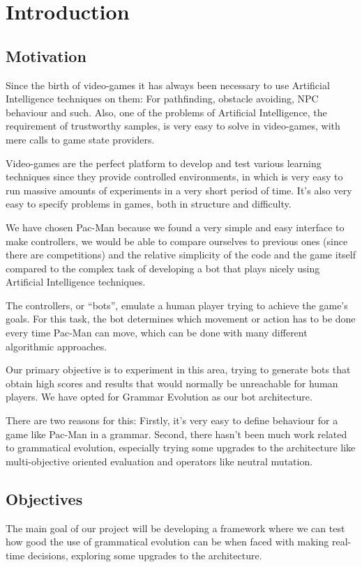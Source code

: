 \chapter{Introduction} \label{cap:introduction}

\section{Motivation}
Since the birth of video-games it has always been necessary to use Artificial Intelligence techniques on them: For pathfinding, obstacle avoiding, NPC behaviour and such. Also, one of the problems of Artificial Intelligence, the requirement of trustworthy samples, is very easy to solve in video-games, with mere calls to game state providers.

Video-games are the perfect platform to develop and test various learning techniques since they provide controlled environments, in which is very easy to run massive amounts of experiments in a very short period of time. It’s also very easy to specify problems in games, both in structure and difficulty.
 
We have chosen Pac-Man because we found a very simple and easy interface to make controllers, we would be able to compare ourselves to previous ones (since there are competitions) and the relative simplicity of the code and the game itself compared to the complex task of developing a bot that plays nicely using Artificial Intelligence techniques.
 
The controllers, or “bots”, emulate a human player trying to achieve the game’s goals. For this task, the bot determines which movement or action has to be done every time Pac-Man can move, which can be done with many different algorithmic approaches.
 
Our primary objective is to experiment in this area, trying to generate bots that obtain high scores and results that would normally be unreachable for human players. We have opted for Grammar Evolution as our bot architecture.

There are two reasons for this: Firstly, it’s very easy to define behaviour for a game like Pac-Man in a grammar. Second, there hasn’t been much work related to grammatical evolution, especially trying some upgrades to the architecture like multi-objective oriented evaluation and operators like neutral mutation. 

\section{Objectives}
The main goal of our project will be developing a framework where we can test how good the use of grammatical evolution can be when faced with making real-time decisions, exploring some upgrades to the architecture.

